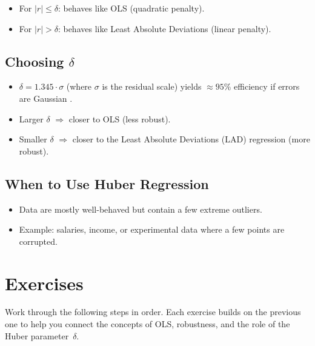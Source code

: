 \documentclass[10pt]{article}
\begin{document}
\begin{itemize}[leftmargin=1.5em]
\item For \(|r| \leq \delta\): behaves like OLS (quadratic penalty).
\item For \(|r| > \delta\): behaves like Least Absolute Deviations (linear penalty).
\end{itemize}

\subsection*{Choosing $\delta$}
\begin{itemize}[leftmargin=1.5em]
\item $\delta = 1.345 \cdot \sigma$ (where $\sigma$ is the residual scale) yields $\approx 95\%$ efficiency if errors are Gaussian \cite{huber2009}.
\item Larger $\delta$ $\Rightarrow$ closer to OLS (less robust).
\item Smaller $\delta$ $\Rightarrow$ closer to the Least Absolute Deviations (LAD) regression (more robust).
\end{itemize}

\subsection*{When to Use Huber Regression}
\begin{itemize}[leftmargin=1.5em]
\item Data are mostly well-behaved but contain a few extreme outliers.
\item Example: salaries, income, or experimental data where a few points are corrupted.
\end{itemize}


\section*{Exercises}
Work through the following steps in order. Each exercise builds on the previous one to help you connect the concepts of OLS, robustness, and the role of the Huber parameter~$\delta$.
\end{document}
